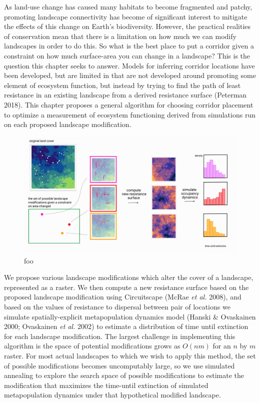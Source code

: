 \documentclass[10pt,oneside]{article}
\makeatletter
\def\maxwidth{\ifdim\Gin@nat@width>\linewidth\linewidth
\else\Gin@nat@width\fi}
\let\Oldincludegraphics\includegraphics
\renewcommand{\includegraphics}[1]{\Oldincludegraphics[width=\maxwidth]{#1}}
\makeatother
\begin{document}
As land-use change has caused many habitats to become fragmented and
patchy, promoting landscape connectivity has become of significant
interest to mitigate the effects of this change on Earth's biodiversity.
However, the practical realities of conservation mean that there is a
limitation on how much we can modify landscapes in order to do this. So
what is the best place to put a corridor given a constraint on how much
surface-area you can change in a landscape? This is the question this
chapter seeks to answer. Models for inferring corridor locations have
been developed, but are limited in that are not developed around
promoting some element of ecosystem function, but instead by trying to
find the path of least resistance in an existing landscape from a
derived resistance surface (Peterman 2018). This chapter proposes a
general algorithm for choosing corridor placement to optimize a
measurement of ecosystem functioning derived from simulations run on
each proposed landscape modification.

\begin{figure}
\hypertarget{fig:ch3}{%
\centering
\includegraphics{./figures/ch3.png}
\caption{foo}\label{fig:ch3}
}
\end{figure}

We propose various landscape modifications which alter the cover of a
landscape, represented as a raster. We then compute a new resistance
surface based on the proposed landscape modification using Circuitscape
(McRae \emph{et al.} 2008), and based on the values of resistance to
dispersal between pair of locations we simulate spatially-explicit
metapopulation dynamics model (Hanski \& Ovaskainen 2000; Ovaskainen
\emph{et al.} 2002) to estimate a distribution of time until extinction
for each landscape modification. The largest challenge in implementing
this algorithm is the space of potential modifications grows as
\(O(nm)\) for an \(n\) by \(m\) raster. For most actual landscapes to
which we wish to apply this method, the set of possible modifications
becomes uncomputably large, so we use simulated annealing to explore the
search space of possible modifications to estimate the modification that
maximizes the time-until extinction of simulated metapopulation dynamics
under that hypothetical modified landscape.
\end{document}
